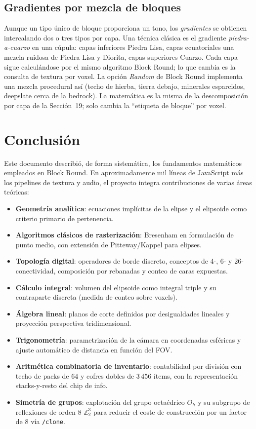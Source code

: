 \documentclass[12pt,a4paper]{scrartcl}
\newcommand{\acc}[1]{\textcolor{accent}{\textbf{#1}}}
\newcommand{\cmd}[1]{\textcolor{earth}{\texttt{\small #1}}}
\begin{document}
\subsection{Gradientes por mezcla de bloques}
Aunque un tipo único de bloque proporciona un tono, los \emph{gradientes} se obtienen intercalando dos o tres tipos por capa. Una técnica clásica es el gradiente \emph{piedra-a-cuarzo} en una cúpula: capas inferiores Piedra Lisa, capas ecuatoriales una mezcla ruidosa de Piedra Lisa y Diorita, capas superiores Cuarzo. Cada capa sigue calculándose por el mismo algoritmo Block Round; lo que cambia es la consulta de textura por voxel. La opción \emph{Random} de Block Round implementa una mezcla procedural así (techo de hierba, tierra debajo, minerales esparcidos, deepslate cerca de la bedrock). La matemática es la misma de la descomposición por capa de la Sección~19; solo cambia la \enquote{etiqueta de bloque} por voxel.

\section{Conclusión}

Este documento describió, de forma sistemática, los fundamentos matemáticos empleados en Block Round. En aproximadamente mil líneas de JavaScript más los pipelines de textura y audio, el proyecto integra contribuciones de varias áreas teóricas:

\begin{itemize}[leftmargin=1.3em,itemsep=0.25em,topsep=0.4em]
  \item \acc{Geometría analítica}: ecuaciones implícitas de la elipse y el elipsoide como criterio primario de pertenencia.
  \item \acc{Algoritmos clásicos de rasterización}: Bresenham en formulación de punto medio, con extensión de Pitteway/Kappel para elipses.
  \item \acc{Topología digital}: operadores de borde discreto, conceptos de 4-, 6- y 26-conectividad, composición por rebanadas y conteo de caras expuestas.
  \item \acc{Cálculo integral}: volumen del elipsoide como integral triple y su contraparte discreta (medida de conteo sobre voxels).
  \item \acc{Álgebra lineal}: planos de corte definidos por desigualdades lineales y proyección perspectiva tridimensional.
  \item \acc{Trigonometría}: parametrización de la cámara en coordenadas esféricas y ajuste automático de distancia en función del FOV.
  \item \acc{Aritmética combinatoria de inventario}: contabilidad por división con techo de packs de $64$ y cofres dobles de $3\,456$ ítems, con la representación stacks-y-resto del chip de info.
  \item \acc{Simetría de grupos}: explotación del grupo octaédrico $O_h$ y su subgrupo de reflexiones de orden $8$ $\mathbb{Z}_2^3$ para reducir el coste de construcción por un factor de $8$ vía \cmd{/clone}.
\end{itemize}
\end{document}

